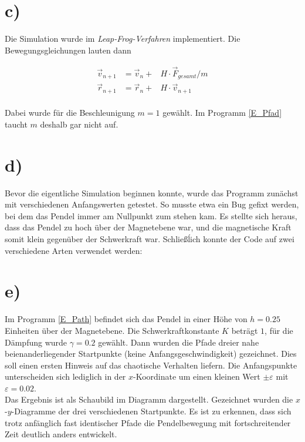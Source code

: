 \section*{c)}
Die Simulation wurde im \textit{Leap-Frog-Verfahren} implementiert. Die Bewegungsgleichungen lauten dann

\begin{align}
\vec{v}_{n+1} &= \vec{v}_n + &H \cdot \vec{F}_{gesamt} / m \\
\vec{r}_{n+1} &= \vec{r}_n + &H \cdot \vec{v}_{n+1}
\end{align}
\\
Dabei wurde für die Beschleunigung $m=1$ gewählt. Im Programm \ref{E_Pfad} taucht $m$ deshalb gar nicht auf.

\section*{d)}
Bevor die eigentliche Simulation beginnen konnte, wurde das Programm zunächst mit verschiedenen Anfangswerten getestet. So musste etwa ein Bug gefixt werden, bei dem das Pendel immer am Nullpunkt zum stehen kam. Es stellte sich heraus, dass das Pendel zu hoch über der Magnetebene war, und die magnetische Kraft somit klein gegenüber der Schwerkraft war. Schließĺich konnte der Code auf zwei verschiedene Arten verwendet werden:

\section{e)}
Im Programm \ref{E_Path} befindet sich das Pendel in einer Höhe von $h=0.25$ Einheiten über der Magnetebene. Die Schwerkraftkonstante $K$ beträgt $1$, für die Dämpfung wurde $\gamma = 0.2$ gewählt. Dann wurden die Pfade dreier nahe beienanderliegender Startpunkte (keine Anfangsgeschwindigkeit) gezeichnet. Dies soll einen ersten Hinweis auf das chaotische Verhalten liefern. Die Anfangspunkte unterscheiden sich lediglich in der $x$-Koordinate um einen kleinen Wert $\pm \varepsilon$ mit $\varepsilon = 0.02$.\\
Das Ergebnis ist als Schaubild im Diagramm \label{fig:xy} dargestellt. Gezeichnet wurden die $x$-$y$-Diagramme der drei verschiedenen Startpunkte. Es ist zu erkennen, dass sich trotz anfänglich fast identischer Pfade die Pendelbewegung mit fortschreitender Zeit deutlich anders entwickelt.

